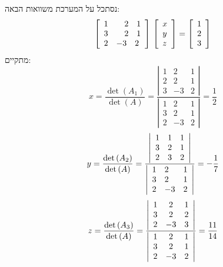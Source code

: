 \documentclass{tstextbook}
\begin{document}
\begin{example}
נסתכל על המערכת משוואות הבאה:
 $${\left[\begin{array}{l l l}{1}&{\quad2\quad1}\\ {3}&{\quad2\quad1}\\ {2}&{-3\quad2}\end{array}\right]}\ {\left[\begin{array}{l}{x}\\ {y}\\ {z}\end{array}\right]}={\left[\begin{array}{l}{1}\\ {2}\\ {3}\end{array}\right]}$$
 מתקיים:
 $$x={\frac{\operatorname*{det}\left(A_{1}\right)}{\operatorname*{det}\left(A\right)}}={\frac{\left|\begin{array}{ccc}{1}&{2}&{1}\\ {2}&{2}&{1} \\ 3 & -3 & 2\end{array}\right|}{\left|\begin{array}{ccc} {1}&{2}&{1}\\{3}&{2}&{1}\\ 2 & -3 & 2\end{array}\right|}}={\frac{1}{2}}$$$$y={\frac{\operatorname*{det}\left(A_{2}\right)}{\operatorname*{det}\left(A\right)}}={\frac{\left|\begin{array}{l l l}{1}&{1}&{1}\\ {3}&{2}&{1}\\ {2}&{3}&{2}\end{array}\right|}{\left|\begin{array}{l l l}{1}&{2}&{1}\\ {3}&{2}&{1}\\ {2}&{-3}&{2}\end{array}\right|}}=-{\frac{1}{7}}$$$$z={\frac{\operatorname*{det}\left(A_{3}\right)}{\operatorname*{det}\left(A\right)}}={\frac{\left|\begin{array}{c c c}{1}&{2}&{1}\\ {3}&{2}&{2} \\ 2  & -3 & 3\end{array}\right|}{\left|\begin{array}{c c c}{1}&{2}&{1}\\ {3}&{2}&{1}\\2 & -3 & 2\end{array}\right|}}={\frac{11}{14}}$$

\end{example}
\end{document}
